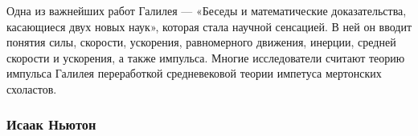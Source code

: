 Одна из важнейших работ Галилея --- «Беседы и математические доказательства, касающиеся двух новых наук», которая стала научной сенсацией. В ней он вводит понятия силы, скорости, ускорения, равномерного движения, инерции, средней скорости и ускорения, а также импульса. Многие исследователи считают теорию импульса Галилея переработкой средневековой теории импетуса мертонских схоластов.

\subsubsection{Исаак Ньютон} 







